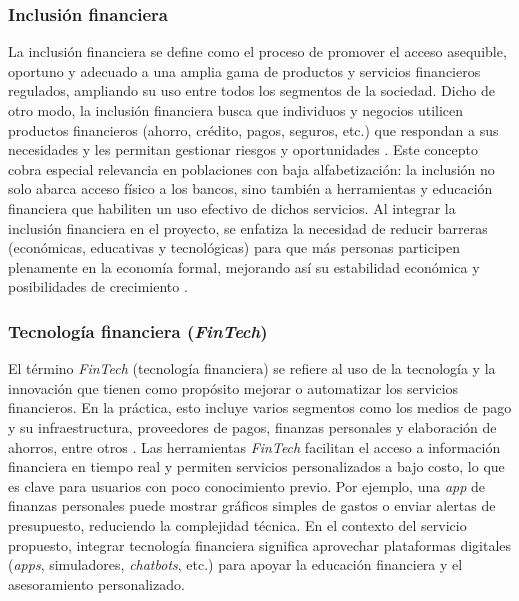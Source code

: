 {}
\subsubsection*{Inclusión financiera}

La inclusión financiera se define como el proceso de promover el acceso asequible, oportuno y adecuado a una amplia gama de productos y servicios financieros regulados, ampliando su uso entre todos los segmentos de la sociedad. Dicho de otro modo, la inclusión financiera busca que individuos y negocios utilicen productos financieros (ahorro, crédito, pagos, seguros, etc.) que respondan a sus necesidades y les permitan gestionar riesgos y oportunidades \parencite[p.~22]{BancoDesarrollo01}. Este concepto cobra especial relevancia en poblaciones con baja alfabetización: la inclusión no solo abarca acceso físico a los bancos, sino también a herramientas y educación financiera que habiliten un uso efectivo de dichos servicios. Al integrar la inclusión financiera en el proyecto, se enfatiza la necesidad de reducir barreras (económicas, educativas y tecnológicas) para que más personas participen plenamente en la economía formal, mejorando así su estabilidad económica y posibilidades de crecimiento \parencite[p.~2]{OECD01}.

{}
\subsubsection*{Tecnología financiera (\textit{FinTech})}

El término \textit{FinTech} (tecnología financiera) se refiere al uso de la tecnología y la innovación que tienen como propósito mejorar o automatizar los servicios financieros. En la práctica, esto incluye varios segmentos como los medios de pago y su infraestructura, proveedores de pagos, finanzas personales y elaboración de ahorros, entre otros \parencite{BancadeOportunidades02}. Las herramientas \textit{FinTech} facilitan el acceso a información financiera en tiempo real y permiten servicios personalizados a bajo costo, lo que es clave para usuarios con poco conocimiento previo. Por ejemplo, una \textit{app} de finanzas personales puede mostrar gráficos simples de gastos o enviar alertas de presupuesto, reduciendo la complejidad técnica. En el contexto del servicio propuesto, integrar tecnología financiera significa aprovechar plataformas digitales (\textit{apps}, simuladores, \textit{chatbots}, etc.) para apoyar la educación financiera y el asesoramiento personalizado.

